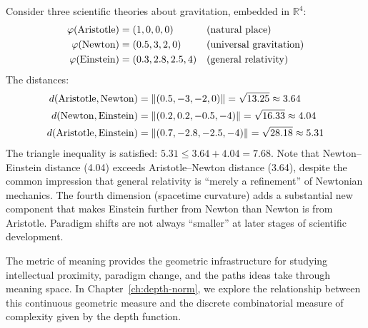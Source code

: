 \begin{example}
\label{ex:scientific-distance}
Consider three scientific theories about gravitation, embedded in
$\mathbb{R}^4$:
\begin{align*}
  \varphi(\text{Aristotle}) &= (1, 0, 0, 0) && \text{(natural place)} \\
  \varphi(\text{Newton}) &= (0.5, 3, 2, 0) && \text{(universal gravitation)} \\
  \varphi(\text{Einstein}) &= (0.3, 2.8, 2.5, 4) && \text{(general relativity)}
\end{align*}
The distances:
\begin{align*}
  d(\text{Aristotle}, \text{Newton}) &= \lVert (0.5, -3, -2, 0) \rVert = \sqrt{13.25}
  \approx 3.64 \\
  d(\text{Newton}, \text{Einstein}) &= \lVert (0.2, 0.2, -0.5, -4) \rVert = \sqrt{16.33}
  \approx 4.04 \\
  d(\text{Aristotle}, \text{Einstein}) &= \lVert (0.7, -2.8, -2.5, -4) \rVert
  = \sqrt{28.18} \approx 5.31
\end{align*}
The triangle inequality is satisfied: $5.31 \leq 3.64 + 4.04 = 7.68$. Note
that Newton--Einstein distance (4.04) exceeds Aristotle--Newton distance (3.64),
despite the common impression that general relativity is ``merely a refinement''
of Newtonian mechanics. The fourth dimension (spacetime curvature) adds a
substantial new component that makes Einstein further from Newton than Newton
is from Aristotle. Paradigm shifts are not always ``smaller'' at later stages
of scientific development.
\end{example}

\bigskip

The metric of meaning provides the geometric infrastructure for studying
intellectual proximity, paradigm change, and the paths ideas take through
meaning space. In Chapter~\ref{ch:depth-norm}, we explore the relationship
between this continuous geometric measure and the discrete combinatorial measure
of complexity given by the depth function.

